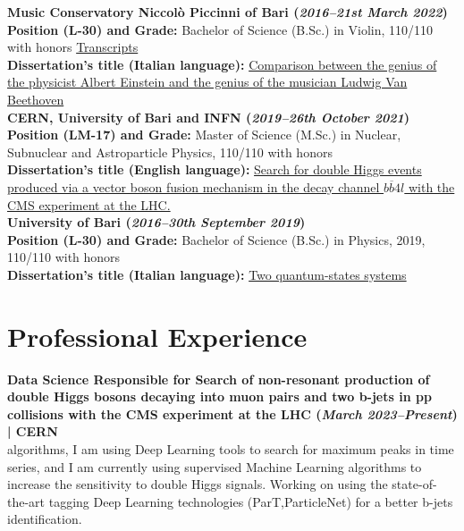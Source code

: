 \documentclass[11pt]{res}
\newcommand{\MarginText}[1]{\section{#1}\vspace{10pt}}
\begin{document}
\begin{resume}
\textbf{Music Conservatory Niccolò Piccinni of Bari (\textit{2016--21st March 2022})}\\
\textbf{Position (L-30) and Grade:} Bachelor of Science (B.Sc.) in Violin, 110/110 with honors \href{https://drive.google.com/file/d/1aV1ERPqgSpQ-9SRbWIpw-Q4BkuS1kvyy/view?usp=share_link}{Transcripts}\\
\textbf{Dissertation's title (Italian language):}
\href{https://drive.google.com/file/d/1D4PbAL-X92U5CsQO8JGemSHA03GEtdu0/view?usp=share_link}{Comparison between the genius of the physicist Albert Einstein and the genius of the musician Ludwig Van Beethoven}\\

\textbf{CERN, University of Bari and INFN (\textit{2019--26th October 2021})}\\
\textbf{Position (LM-17) and Grade:} Master of Science (M.Sc.) in Nuclear, Subnuclear and Astroparticle Physics, 110/110 with honors\\
\textbf{Dissertation's title (English language):}
\href{https://inspirehep.net/literature/1955669}{Search for double Higgs events produced via a vector boson fusion mechanism in the decay channel $b\overline{b}4l$ with the CMS experiment at the LHC.}\\

\textbf{University of Bari (\textit{2016--30th September 2019})}\\
\textbf{Position (L-30) and Grade:} Bachelor of Science (B.Sc.) in Physics, 2019, 110/110 with honors\\
\textbf{Dissertation's title (Italian language):} 
\href{https://drive.google.com/file/d/1fyNx6B4lviqkeJxsrIEsZ-UJhCTqDaSC/view?usp=share_link}{Two quantum-states systems}\\


\MarginText{Professional Experience}

\textbf{Data Science Responsible for Search of non-resonant production of double Higgs bosons decaying into muon pairs and two b-jets in pp collisions with the CMS experiment at the LHC (\textit{March 2023--Present}) | CERN}\\
 algorithms, I am using Deep Learning tools to search for maximum peaks in time series, and I am currently using supervised Machine Learning algorithms to increase the sensitivity to double Higgs signals. Working on using the state-of-the-art tagging Deep Learning technologies (ParT,ParticleNet) for a better b-jets identification.\\


\end{resume}
\end{document}
